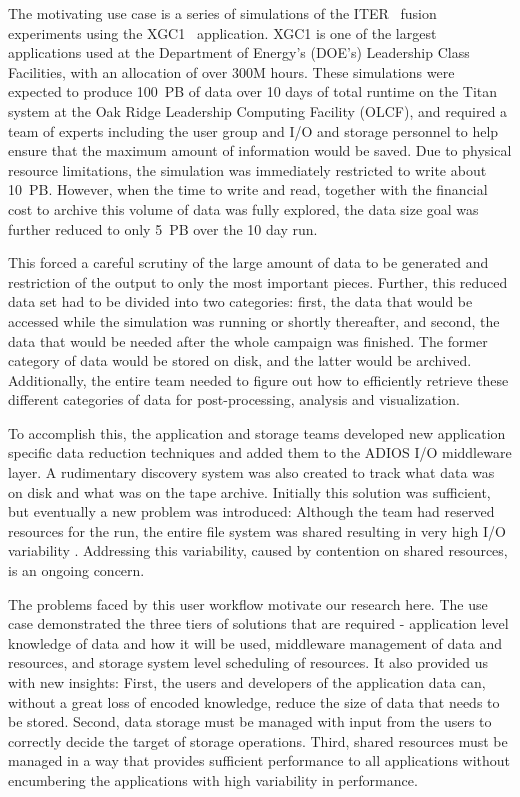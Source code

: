 The motivating use case is a series of simulations of the
ITER~\cite{dietz1996iter} fusion experiments using the
XGC1~\cite{chang2006integrated} application. XGC1 is one of the largest
applications used at the Department of Energy's (DOE's) Leadership Class
Facilities, with an allocation of over 300M hours. 
These simulations were expected to produce 100~PB of data over 10 days of
total runtime on the Titan system at the Oak Ridge Leadership Computing
Facility (OLCF), and required a team of experts including
the user group and I/O and storage personnel to help ensure that the maximum
amount of information would be saved. Due to physical resource limitations,
the simulation was immediately restricted to write about 10~PB. However,
when the time to write and read, together with the financial cost to archive
this volume of data was fully explored, the data size goal was further
reduced to only 5~PB over the 10 day run. 

This forced a careful scrutiny of the large amount of data to be generated
and restriction of the output to only the most important pieces. Further,
this reduced data set had to be divided into two categories: first, the data
that would be accessed while the simulation was running or shortly
thereafter, and second, the data that would be needed after the whole
campaign was finished. The former category of data would be stored on disk,
and the latter would be archived. Additionally, the entire team needed to
figure out how to efficiently retrieve these different categories of data
for post-processing, analysis and visualization.

To accomplish this, the application and storage teams developed new
application specific data reduction techniques and added them to the ADIOS
I/O middleware layer. A rudimentary discovery system was also created to
track what data was on disk and what was on the tape archive. Initially this
solution was sufficient, but eventually a new problem was introduced:
Although the team had reserved resources for the run, the entire file system
was shared \cite{shipman2012next} resulting in very high I/O variability
\cite{lofstead:2010:io-variability}. Addressing this variability, caused by
contention on shared resources, is an ongoing concern. 

The problems faced by this user workflow motivate our research here. The use
case demonstrated the three tiers of solutions that are required -
application level knowledge of data and how it will be used, middleware
management of data and resources, and storage system level scheduling of
resources. It also provided us with new insights: First, the users and developers
of the application data can, without a great loss of encoded knowledge,
reduce the size of data that needs to be stored. Second, data storage must
be managed with input from the users to correctly decide the target of
storage operations. Third, shared resources must be managed in a way that
provides sufficient performance to all applications without encumbering the
applications with high variability in performance. 

